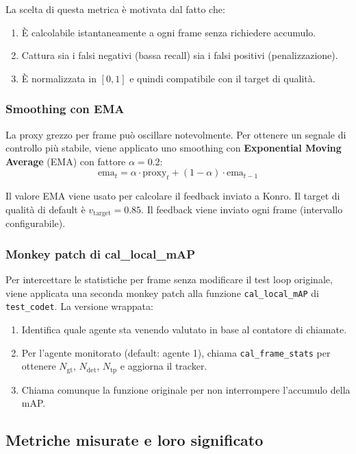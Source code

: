 \documentclass[12pt,a4paper]{article}
\begin{document}
La scelta di questa metrica \`e motivata dal fatto che:
\begin{enumerate}
  \item \`E calcolabile istantaneamente a ogni frame senza richiedere accumulo.
  \item Cattura sia i falsi negativi (bassa recall) sia i falsi positivi (penalizzazione).
  \item \`E normalizzata in $[0, 1]$ e quindi compatibile con il target di qualit\`a.
\end{enumerate}

\subsubsection{Smoothing con EMA}

La proxy grezzo per frame pu\`o oscillare notevolmente. Per ottenere un segnale di
controllo pi\`u stabile, viene applicato uno smoothing con \textbf{Exponential Moving
Average} (EMA) con fattore $\alpha = 0.2$:
\begin{equation}
  \text{ema}_t = \alpha \cdot \text{proxy}_t + (1-\alpha) \cdot \text{ema}_{t-1}
\end{equation}

Il valore EMA viene usato per calcolare il feedback inviato a Konro. Il target di
qualit\`a di default \`e $v_\text{target} = 0.85$. Il feedback viene inviato ogni frame
(intervallo configurabile).

\subsubsection{Monkey patch di cal\_local\_mAP}

Per intercettare le statistiche per frame senza modificare il test loop originale, viene
applicata una seconda monkey patch alla funzione \texttt{cal\_local\_mAP} di
\texttt{test\_codet}. La versione wrappata:
\begin{enumerate}
  \item Identifica quale agente sta venendo valutato in base al contatore di chiamate.
  \item Per l'agente monitorato (default: agente 1), chiama \texttt{cal\_frame\_stats}
        per ottenere $N_\text{gt}$, $N_\text{det}$, $N_\text{tp}$ e aggiorna il tracker.
  \item Chiama comunque la funzione originale per non interrompere l'accumulo della mAP.
\end{enumerate}

\subsection{Metriche misurate e loro significato}
\end{document}
